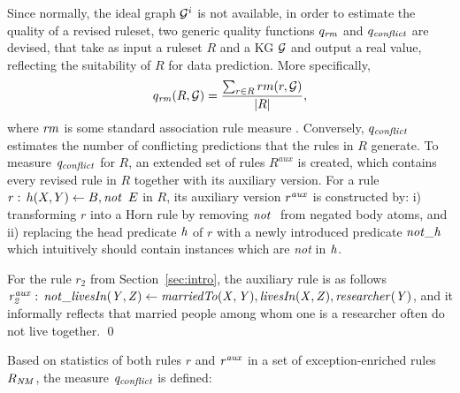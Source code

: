 Since normally, the ideal graph $\mathcal{G}^i$ is not available, in order to estimate the quality of a
revised ruleset, two generic quality functions $q_{\mathit{rm}}$ and
$q_{\mathit{conflict}}$ are devised, that take as input a ruleset $R$ and a KG $\mathcal{G}$ and output a
real value, reflecting the suitability of $R$ for data prediction.  More
specifically, \begin{equation}q_{\mathit{rm}} (R,\mathcal{G})=\dfrac{\sum_{r\in
    R}rm(r,\mathcal{G})}{|R|}, \end{equation} where $\mathit{rm}$ is some standard
association rule measure \cite{Azevedo2007}. Conversely, $q_{\mathit{conflict}}$ estimates the number of conflicting predictions that the rules in $R$ generate. To measure $\mathit{q_{conflict}}$ for
$R$, an extended set of rules $R^{aux}$ is created, which contains every %
revised rule in $R$ %
together with %
its auxiliary version. For a rule $r:\,h(X,Y)\leftarrow B,\mathit{not}~ \,E$ in $R$,
its auxiliary version $r^{\mathit{aux}}$ is constructed by: i) transforming $r$ into a Horn rule by
removing %
$\naf$ from negated body atoms, %
and ii) replacing the head
predicate $\mathit{h}$ of $r$ %
with a newly introduced predicate $\mathit{not\_h}$ which intuitively should contain %
instances which are \emph{not} in $\mathit{h}$. 

\begin{example} For the rule $r_2$ from Section~\ref{sec:intro}, the auxiliary rule is as follows $\mathit{r_2^{aux}:\,not\_livesIn(Y,Z)\leftarrow marriedTo(X,Y),livesIn(X,Z),researcher(Y)}$, and it informally reflects that married people among whom one is a researcher often do not live together. \qed
\end{example}


Based on statistics of both rules $r$ and $\mathit{r^{aux}}$ in a set of exception-enriched rules $R_{\mathit{NM}}$, the measure $\mathit{q_{conflict}}$ is defined:


